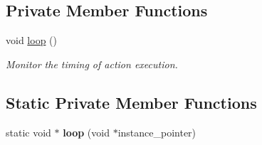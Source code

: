\subsection*{Private Member Functions}
\begin{DoxyCompactItemize}
\item 
void \hyperlink{classrobot__interfaces_1_1MonitoredRobotDriver_a6ed3d940dce484dcdc558a52a8dfe8a5}{loop} ()
\begin{DoxyCompactList}\small\item\em Monitor the timing of action execution. \end{DoxyCompactList}\end{DoxyCompactItemize}
\subsection*{Static Private Member Functions}
\begin{DoxyCompactItemize}
\item 
static void $\ast$ {\bfseries loop} (void $\ast$instance\+\_\+pointer)\hypertarget{classrobot__interfaces_1_1MonitoredRobotDriver_a46ddb0472196631d6cdd109f3753c693}{}\label{classrobot__interfaces_1_1MonitoredRobotDriver_a46ddb0472196631d6cdd109f3753c693}

\end{DoxyCompactItemize}

